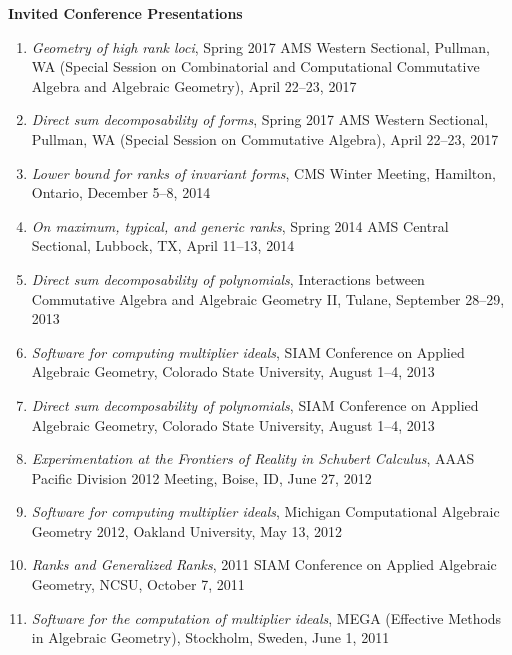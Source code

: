 \documentclass[12pt]{article}
\begin{document}
\textbf{Invited Conference Presentations}
\begin{enumerate}
\item \textit{Geometry of high rank loci},
Spring 2017 AMS Western Sectional, Pullman, WA
(Special Session on Combinatorial and Computational Commutative Algebra and Algebraic Geometry),
April 22--23, 2017

\item \textit{Direct sum decomposability of forms},
Spring 2017 AMS Western Sectional, Pullman, WA
(Special Session on Commutative Algebra),
April 22--23, 2017

\item \textit{Lower bound for ranks of invariant forms},
CMS Winter Meeting, Hamilton, Ontario,
December 5--8, 2014

\item \textit{On maximum, typical, and generic ranks},
Spring 2014 AMS Central Sectional, Lubbock, TX,
April 11--13, 2014

\item \textit{Direct sum decomposability of polynomials},
Interactions between Commutative Algebra and Algebraic Geometry II,
Tulane,
September 28--29, 2013

\item \textit{Software for computing multiplier ideals},
SIAM Conference on Applied Algebraic Geometry,
Colorado State University,
August 1--4, 2013

\item \textit{Direct sum decomposability of polynomials},
SIAM Conference on Applied Algebraic Geometry,
Colorado State University,
August 1--4, 2013

\item \textit{Experimentation at the Frontiers of Reality in Schubert Calculus},
AAAS Pacific Division 2012 Meeting,
Boise, ID, June 27, 2012

\item \textit{Software for computing multiplier ideals},
Michigan Computational Algebraic Geometry 2012,
Oakland University, May 13, 2012

\item \textit{Ranks and Generalized Ranks},
2011 SIAM Conference on Applied Algebraic Geometry,
NCSU, October 7, 2011

\item \textit{Software for the computation of multiplier ideals},
MEGA (Effective Methods in Algebraic Geometry), Stockholm, Sweden, June 1, 2011


\end{enumerate}
\end{document}
